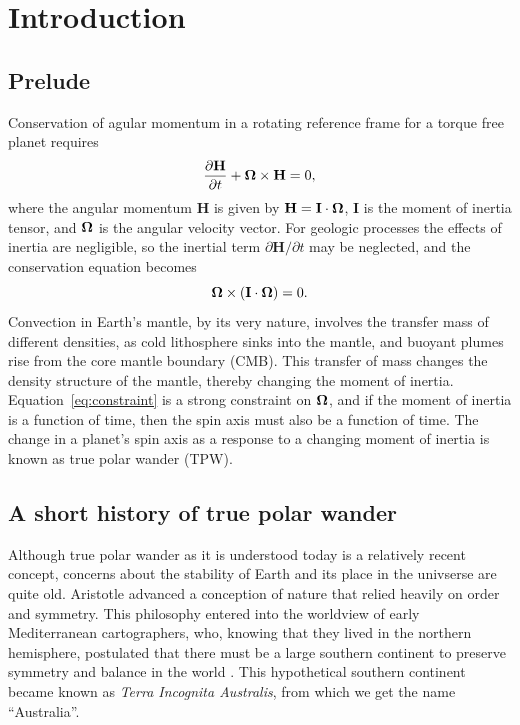 \chapter{Introduction}
\label{chap:intro}

\section{Prelude}

Conservation of agular momentum in a rotating reference frame for a torque free planet requires
\begin{equation}
\frac{\partial \mathbf{H}}{\partial t} + \mitbf{\Omega}\times\mathbf{H} = 0,
\label{eq:conserve_momentum_rotating}
\end{equation}
where the angular momentum $\mathbf{H}$ is given by $\mathbf{H} = \mathbf{I}\cdot\mitbf{\Omega}$,
$\mathbf{I}$ is the moment of inertia tensor, and $\mitbf{\Omega}$ is the angular velocity vector.
For geologic processes the effects of inertia are negligible, so the inertial
term $\partial \mathbf{H} / \partial t$ may be neglected, and the conservation equation becomes 
\begin{equation}
\mitbf{\Omega}\times \left(\mathbf{I} \cdot \mitbf{\Omega}\right)= 0.
\label{eq:constraint}
\end{equation}
Convection in Earth's mantle, by its very nature, involves the transfer mass of different densities,
as cold lithosphere sinks into the mantle, and buoyant plumes rise from the core mantle boundary (CMB).
This transfer of mass changes the density structure of the mantle, thereby changing the moment of inertia.
Equation~\eqref{eq:constraint} is a strong constraint on $\mitbf{\Omega}$, and if the moment of inertia
is a function of time, then the spin axis must also be a function of time.
The change in a planet's spin axis as a response to a changing moment of inertia is known as true polar wander (TPW).


\section{A short history of true polar wander}

Although true polar wander as it is understood today is a relatively recent concept,
concerns about the stability of Earth and its place in the univserse are quite old.
Aristotle advanced a conception of nature that relied heavily on order and symmetry.
This philosophy entered into the worldview of early Mediterranean cartographers, who, knowing that
they lived in the northern hemisphere, postulated that there must be a large
southern continent to preserve symmetry and balance in the world \citep{wilford2001mapmakers}.
This hypothetical southern continent became known as \emph{Terra Incognita Australis}, from which
we get the name ``Australia''.

